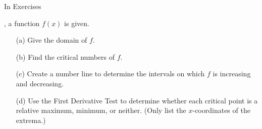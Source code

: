 {\noindent In Exercises}
{, a function $f(x)$ is given.
	\begin{enumerate}
	\item	[(a)] Give the domain of $f$.
	\item	[(b)] Find the critical numbers of $f$.
	\item	[(c)] Create a number line to determine the intervals on which $f$ is increasing and decreasing.
	\item	[(d)] Use the First Derivative Test to determine whether each critical point is a relative maximum, minimum, or neither.  (Only list the $x$-coordinates of the extrema.)
	\end{enumerate}
}
